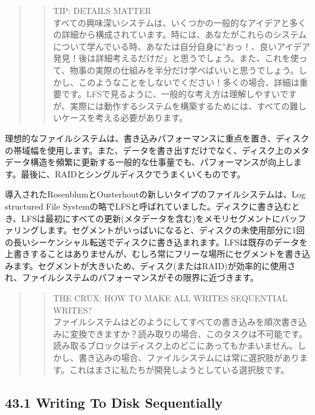 \begin{quote}
\begin{quote}
TIP: DETAILS MATTER\\
すべての興味深いシステムは、いくつかの一般的なアイデアと多くの詳細から構成されています。時には、あなたがこれらのシステムについて学んでいる時、あなたは自分自身に"おっ！、良いアイデア発見！後は詳細考えるだけだ」と思うでしょう。また、これを使って、物事の実際の仕組みを半分だけ学べばいいと思うでしょう。しかし、このようなことをしないでください！多くの場合、詳細は重要です。LFSで見るように、一般的な考え方は理解しやすいですが、実際には動作するシステムを構築するためには、すべての難しいケースを考える必要があります。
\end{quote}
\end{quote}

理想的なファイルシステムは、書き込みパフォーマンスに重点を置き、ディスクの帯域幅を使用します。また、データを書き出すだけでなく、ディスク上のメタデータ構造を頻繁に更新する一般的な仕事量でも、パフォーマンスが向上します。最後に、RAIDとシングルディスクでうまくいくものです。

導入されたRosenblumとOusterhoutの新しいタイプのファイルシステムは、Log
structured File
Systemの略でLFSと呼ばれていました。ディスクに書き込むとき、LFSは最初にすべての更新(メタデータを含む)をメモリセグメントにバッファリングします。セグメントがいっぱいになると、ディスクの未使用部分に1回の長いシーケンシャル転送でディスクに書き込まれます。LFSは既存のデータを上書きすることはありませんが、むしろ常にフリーな場所にセグメントを書き込みます。セグメントが大きいため、ディスク(またはRAID)が効率的に使用され、ファイルシステムのパフォーマンスがその限界に近づきます。

\begin{quote}
\begin{quote}
THE CRUX: HOW TO MAKE ALL WRITES SEQUENTIAL WRITES?\\
ファイルシステムはどのようにしてすべての書き込みを順次書き込みに変換できますか？読み取りの場合、このタスクは不可能です。読み取るブロックはディスク上のどこにあってもかまいません。しかし、書き込みの場合、ファイルシステムには常に選択肢があります。これはまさに私たちが開発しようとしている選択肢です。
\end{quote}
\end{quote}

\hypertarget{writing-to-disk-sequentially}{%
\subsection*{43.1 Writing To Disk
Sequentially}\label{writing-to-disk-sequentially}}

